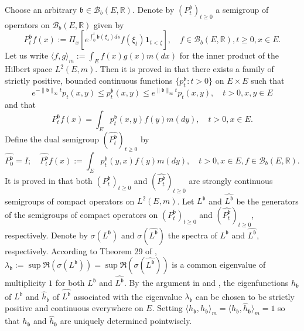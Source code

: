 \documentclass[12pt,a4paper]{amsart}
\numberwithin{equation}{section}
\theoremstyle{plain}
\theoremstyle{definition}
\theoremstyle{remark}
\begin{document}
	Choose an arbitrary $ \mathfrak b\in \mathcal B_b(E,\mathbb R)$.
	Denote by $(P_t^\mathfrak b)_{t\geq 0}$ a semigroup of operators on $\mathcal B_b(E,\mathbb R)$ given by
\begin{equation}
	P_t^\mathfrak b f(x)
	:= \Pi_x[e^{\int_0^t \mathfrak b(\xi_s)ds} f(\xi_t) \mathbf 1_{t< \zeta}],
	\quad f\in \mathcal B_b(E, \mathbb R), t\geq 0, x\in E.
\end{equation}
	Let us write $\langle f,g \rangle_m:= \int_E f(x)g(x) m(dx)$ for  the inner product of the Hilbert space $L^2(E,m)$.
	Then it is proved in \cite{RenSongZhang2015Limit, RenSongZhang2017Central} that there exists a family of strictly positive, bounded continuous functions $\{p_t^\mathfrak b: t> 0\}$ on $E\times E$ such that
\begin{equation} \label{eq:IU.0}
	e^{-\|\mathfrak b\|_\infty t} p_t(x,y)
	\leq p_t^\mathfrak b(x,y) \leq e^{\|\mathfrak b\|_\infty t}p_t(x,y),
	\quad t>0, x,y\in E
\end{equation}
	and that
\begin{equation}
	P_t^\mathfrak b f(x)
	= \int_E p_t^\mathfrak b(x,y) f(y) m(dy),
	\quad t>0, x\in E.
\end{equation}
	Define the dual semigroup $(\widehat {P^{\mathfrak b}_t} )_{t\geq 0}$ by
\begin{equation}
	\widehat {P_0^{\mathfrak b}}
	= I;
	\quad \widehat {P_t^{\mathfrak b}} f(x)
	:= \int_E p_t^\mathfrak b(y,x) f(y) m(dy),
	\quad t>0,x\in E, f\in \mathcal B_b(E,\mathbb R).
\end{equation}
	It is proved in \cite{RenSongZhang2015Limit, RenSongZhang2017Central} that both $(P_t^\mathfrak b)_{t\geq 0}$ and $(\widehat {P_t^\mathfrak b})_{t\geq 0}$ are strongly continuous semigroups of compact operators on $L^2(E,m)$.	
	Let $L^\mathfrak b$ and $\widehat {L^\mathfrak b}$ be the generators of the semigroups of compact operators on $(P_t^\mathfrak b)_{t\geq 0}$ and $(\widehat {P_t^\mathfrak b})_{t\geq 0}$, respectively.
	Denote by $\sigma(L^\mathfrak b)$ and $\sigma(\widehat{L^\mathfrak b})$ the spectra of $L^\mathfrak b$ and $\widehat {L^{\mathfrak b}}$, respectively.
	According to Theorem 29 of \cite{Schaefer1974Banach}, $\lambda_\mathfrak b:= \sup \Re(\sigma(L^\mathfrak b)) = \sup \Re(\sigma( \widehat{L^\mathfrak b})) $ is a common eigenvalue of multiplicity $1$ for both $L^\mathfrak b$ and $\widehat {L^{\mathfrak b}}$.
	By the argument in \cite{RenSongZhang2015Limit} and \cite{RenSongZhang2017Central}, the eigenfunctions $h_\mathfrak b$ of $L^\mathfrak b$ and $\widehat h_\mathfrak b$ of $\widehat{L^\mathfrak b}$ associated with the eigenvalue $\lambda_\mathfrak b$ can be chosen to be strictly positive and continuous everywhere on $E$.
	Setting $\langle h_\mathfrak b,h_\mathfrak b\rangle_m = \langle h_\mathfrak b, \widehat h_\mathfrak b\rangle_m = 1$ so that $h_\mathfrak b$ and $\widehat h_\mathfrak b$ are uniquely determined pointwisely.
\end{document}
